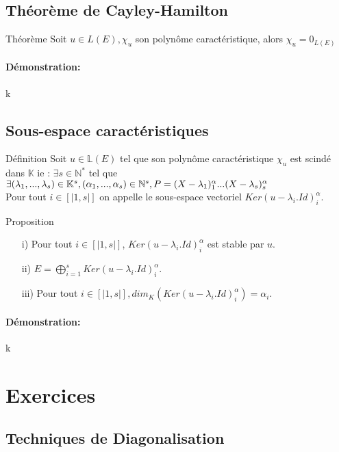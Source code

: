 \documentclass{book}
\begin{document}
\subsection{Théorème de Cayley-Hamilton}
\begin{Théorème}[]{Théorème}{}
Soit \(u \in L(E), \chi_{u}\) son polynôme caractéristique, alors \(\chi_{u}=0_{L(E)}\)
\end{Théorème}
\paragraph{Démonstration:}
k
\subsection{Sous-espace caractéristiques}
\begin{Définition}[]{Définition}
{}
Soit \(u \in \mathbb{L}(E)\) tel que son polynôme caractéristique \(\chi_{u}\) est scindé dans \(\mathbb{K}\) ie : \(\exists s \in \mathbb{N}^*\) tel que \(\exists (\lambda_{1},...,\lambda_{s}) \in \mathbb{K}^s, (\alpha_{1},...,\alpha_{s}) \in \mathbb{N}^s, \\ P=(X-\lambda_{1})^\alpha_{1}...(X-\lambda_{s})^\alpha_{s}\) \\
Pour tout \(i \in [|1,s|]\) on appelle  le sous-espace vectoriel \(Ker(u-\lambda_{i}.Id)^\alpha_{i}\).
\end{Définition}
\begin{Propriété}[]{Proposition}{}
\begin{itemize}
    \item[i)] Pour tout \(i \in [|1,s|]\), \(Ker(u-\lambda_{i}.Id)^\alpha_{i}\) est stable par \(u\).
    \item[ii)] \(E=\bigoplus_{i=1}^s Ker(u-\lambda_{i}.Id)^\alpha_{i} \).
    \item[iii)] Pour tout \(i \in [|1,s|], dim_{K}(Ker(u-\lambda_{i}.Id)^\alpha_{i})=\alpha_{i}\).
\end{itemize}
\end{Propriété}
\paragraph{Démonstration:}
k
\section{Exercices}
\subsection{Techniques de Diagonalisation}
\end{document}
